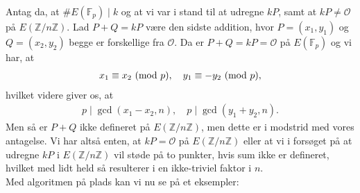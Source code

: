 Antag da, at $\#E(\mathbb{F}_p) \mid k$ og at vi var i stand til at udregne $kP$, samt at $kP \neq \mathcal{O}$ på $E(\mathbb{Z}/n\mathbb{Z})$. Lad $P+Q = kP$ være den sidste addition, hvor $P=(x_1, y_1)$ og $Q=(x_2, y_2)$ begge er forskellige fra $\mathcal{O}$. Da er $P+Q=kP=\mathcal{O}$ på $E(\mathbb{F}_p)$ og vi har, at
\begin{align*}
	x_1 \equiv x_2 \ (\mathrm{mod} \ p), \quad y_1 \equiv -y_2 \ (\mathrm{mod} \ p),
\end{align*}
hvilket videre giver os, at 
\begin{align*}
	p \mid \gcd(x_1 - x_2, n), \quad p \mid \gcd(y_1 + y_2, n).
\end{align*}
Men så er $P+Q$ ikke defineret på $E(\mathbb{Z}/n \mathbb{Z})$, men dette er i modstrid med vores antagelse. Vi har altså enten, at $kP = \mathcal{O}$ på $E(\mathbb{Z}/n\mathbb{Z})$ eller at vi i forsøget på at udregne $kP$ i $E(\mathbb{Z}/n\mathbb{Z})$ vil støde på to punkter, hvis sum ikke er defineret, hvilket med lidt held så resulterer i en ikke-triviel faktor i $n$.
\\[10pt]
Med algoritmen på plads kan vi nu se på et eksempler:


